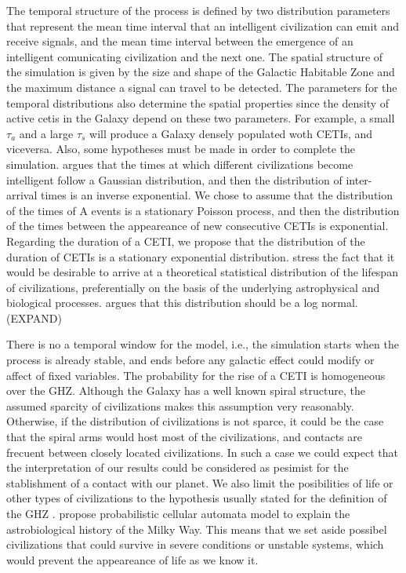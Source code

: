 \documentclass[crop]{CSLB}%
\begin{document}
The temporal structure of the process is defined by two distribution
parameters that represent the mean time interval that an intelligent
civilization can emit and receive signals, and the mean time interval
between the emergence of an intelligent comunicating civilization and
the next one.
%
The spatial structure of the simulation is given by the size and shape
of the Galactic Habitable Zone and the maximum distance a signal can
travel to be detected.
%
The parameters for the temporal distributions also determine the
spatial properties since the density of active cetis in the Galaxy
depend on these two parameters.
%
For example, a small $\tau_a$ and a large $\tau_s$ will produce a
Galaxy densely populated woth CETIs, and viceversa.
%
Also, some hypotheses must be made in order to complete the
simulation.
%
\citet{forgan_spatiotemporal_2011} argues that the times at which
different civilizations become intelligent 
follow a Gaussian distribution, and then the distribution of
inter-arrival times is an inverse exponential.
%
We chose to assume that the distribution of the times of A events is a
stationary Poisson process, and then the distribution of the times between the
appeareance of new consecutive CETIs is exponential.
%
Regarding the duration of a CETI, we propose that the distribution of
the duration of CETIs is a stationary exponential distribution.
%
\citet{balbi_impact_2018} stress the fact that it would be desirable to arrive
at a theoretical statistical distribution of the lifespan of
civilizations, preferentially on the basis of the underlying
astrophysical and biological processes.
%
\citet{maccone_lognormals_2014} argues that this distribution should be a log normal.
(EXPAND)



There is no a temporal window for the model, i.e., the simulation
starts when the process is already stable, and ends before any
galactic effect could modify or affect of fixed variables.
%
The probability for the rise of a CETI is homogeneous over the GHZ.
%
Although the Galaxy has a well known spiral structure, the assumed
sparcity of civilizations makes this assumption very reasonably.
%
Otherwise, if the distribution of civilizations is not sparce, it
could be the case that the spiral arms would host most of the
civilizations, and contacts are frecuent between closely located
civilizations.
%
In such a case we could expect that the interpretation of our results
could be considered as pesimist for the stablishment of a contact with
our planet.
%
We also limit the posibilities of life or other types of civilizations
to the hypothesis usually stated for the definition of the GHZ
\citep{dayal_habitability_2016,gonzalez_galactic_2001,lineweaver_galactic_2004,gonzalez_habitable_2005,morrison_extending_2015,haqq-misra_evolution_2019,rahvar_cosmic_2016,gobat_evolution_2016,
rahvar_cosmic_2016}.
%
\citet{vukotic_astrobiological_2012} propose probabilistic cellular
automata model to explain the astrobiological history of the Milky
Way.
%
This means that we set aside possibel civilizations that could survive
in severe conditions or unstable systems, which would prevent the
appeareance of life as we know it.
\end{document}
